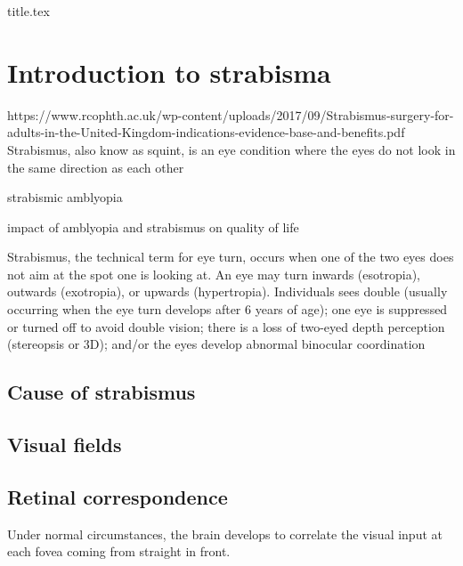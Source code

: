 \documentclass[12pt]{article}
\begin{document}
{title.tex}

\newpage
{}

\tableofcontents
\listoffigures
\listoftables
\newpage

\section{Introduction to strabisma}
https://www.rcophth.ac.uk/wp-content/uploads/2017/09/Strabismus-surgery-for-adults-in-the-United-Kingdom-indications-evidence-base-and-benefits.pdf
Strabismus, also know as squint, is an eye condition where the eyes do not look in the same direction as each other

strabismic amblyopia

impact of amblyopia and strabismus on quality of life

Strabismus, the technical term for eye turn, occurs when one of the two eyes does not aim at the spot one is looking at. An eye may turn inwards (esotropia), outwards (exotropia), or upwards (hypertropia).
Individuals sees double (usually occurring when the eye turn develops after 6 years of age); one eye is suppressed or turned off to avoid double vision; there is a loss of two-eyed depth perception (stereopsis or 3D); and/or the eyes develop abnormal binocular coordination
\subsection{Cause of strabismus}
\subsection{Visual fields}

\subsection{Retinal correspondence}
Under normal circumstances, the brain develops to correlate the visual input at each fovea coming from straight in front.
\end{document}

